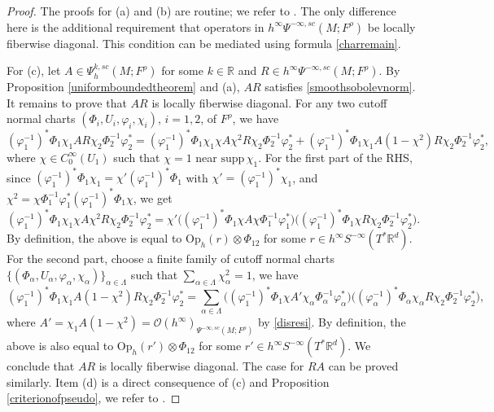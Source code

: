 \documentclass[11pt,oneside,reqno]{amsart}
\newcommand\R{\ensuremath{\mathbb{R}}}
\newcommand\Oph{\ensuremath{\mathrm{Op}_h}}
\theoremstyle{definition}
\numberwithin{equation}{section}
\theoremstyle{plain}
\begin{document}
\begin{proof}
The proofs for (a) and (b) are routine; we refer to \cite[Proposition E.16-17]{dyatlovzworski2019resonances}. The only difference here is the additional requirement that operators in $h^{\infty} \Psi^{-\infty,sc}(M;F^\rho)$ be locally fiberwise diagonal. This condition can be mediated using formula \eqref{charremain}.

For (c), let $A \in \Psi^{k,sc}_h(M;F^{\rho})$ for some $k \in \R$ and $R\in h^{\infty}\Psi^{-\infty,sc}(M;F^{\rho})$. By Proposition \ref{uniformboundedtheorem} and (a), $AR$ satisfies \eqref{smoothsobolevnorm}. It remains to prove that $AR$ is locally fiberwise diagonal. For any two cutoff normal charts $(\Phi_i,U_i,\varphi_i,\chi_i)$, $i=1,2$, of $F^\rho$, we have
\begin{equation*}
        (\varphi^{-1}_1)^{*}\Phi_1\chi_1 AR \chi_2\Phi^{-1}_2\varphi^{*}_2  = (\varphi^{-1}_1)^{*}\Phi_1\chi_1 \chi A\chi^2R \chi_2\Phi^{-1}_2\varphi^{*}_2 + (\varphi^{-1}_1)^{*}\Phi_1\chi_1 A(1-\chi^2)R \chi_2\Phi^{-1}_2\varphi^{*}_2,
\end{equation*}
where $\chi \in C_0^\infty(U_1) $ such that $\chi =1$ near $\mathrm{supp}\, \chi_1$. For the first part of the RHS, since $(\varphi^{-1}_1)^{*}\Phi_1\chi_1 = \chi' (\varphi^{-1}_1)^{*}\Phi_1$ with $\chi' = (\varphi^{-1}_1)^{*} \chi_1$, and $\chi^2 = \chi \Phi_1^{-1} \varphi^*_1 (\varphi^{-1}_1)^{*}\Phi_1\chi$, we get
\begin{equation*}
        (\varphi^{-1}_1)^{*}\Phi_1\chi_1\chi A\chi^2R \chi_2\Phi^{-1}_2\varphi^{*}_2 = \chi' \Big( (\varphi^{-1}_1)^{*}\Phi_1 \chi A\chi \Phi_1^{-1} \varphi^*_1 \Big) \Big( (\varphi^{-1}_1)^{*}\Phi_1\chi R\chi_2\Phi^{-1}_2\varphi^{*}_2 \Big) . 
\end{equation*}
By definition, the above is equal to $\Oph(r) \otimes \Phi_{12}$ for some $r \in h^\infty S^{-\infty}(T^*\R^d)$. For the second part, choose a finite family of cutoff normal charts $ \{ (\Phi_{\alpha}, U_{\alpha}, \varphi_{\alpha},\chi_{\alpha} ) \}_{\alpha\in \Lambda}$ such that $\sum_{\alpha \in \Lambda} \chi_\alpha^2 =1$, we have
\begin{equation*}
        (\varphi^{-1}_1)^{*}\Phi_1\chi_1 A(1-\chi^2)R \chi_2\Phi^{-1}_2\varphi^{*}_2 = \sum_{\alpha \in \Lambda} \Big( (\varphi^{-1}_1)^{*}\Phi_1 \chi A' \chi_\alpha \Phi_\alpha^{-1} \varphi_{\alpha}^* \Big)  \Big( (\varphi^{-1}_\alpha)^{*}\Phi_\alpha \chi_\alpha  R \chi_2\Phi^{-1}_2\varphi^{*}_2  \Big),
\end{equation*}
where $A'=\chi_1 A(1-\chi^2) =\mathcal{O} (h^{\infty} )_{\Psi^{-\infty,sc}(M;F^\rho)}$ by \eqref{disresi}. By definition, the above is also equal to $\Oph(r') \otimes \Phi_{12}$ for some $r' \in h^\infty S^{-\infty}(T^*\R^d)$. We conclude that $AR $ is locally fiberwise diagonal. The case for $RA$ can be proved similarly. Item (d) is a direct consequence of (c) and Proposition \ref{criterionofpseudo}, we refer to \cite[Proposition E.17]{dyatlovzworski2019resonances}.
\end{proof}
\end{document}
